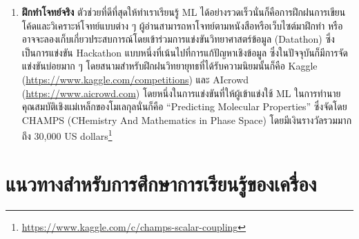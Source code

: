 \begin{enumerate}[topsep=0pt,noitemsep]
    \item \textbf{ฝึกทำโจทย์จริง} ตัวช่วยที่ดีที่สุดให้ทำเราเรียนรู้ ML ได้อย่างรวดเร็วนั่นก็คือการฝึกฝนการเขียนโค้ดและวิเคราะห์โจทย์แบบต่าง ๆ ผู้อ่านสามารถหาโจทย์ตามหนังสือหรือเว็บไซต์มาฝึกทำ หรืออาจจะลองเก็บเกี่ยวประสบการณ์โดยเข้าร่วมการแข่งขันวิทยาศาสตร์ข้อมูล (Datathon) ซึ่งเป็นการแข่งขัน Hackathon แบบหนึ่งที่เน้นไปที่การแก้ปัญหาเชิงข้อมูล ซึ่งในปัจจุบันก็มีการจัดแข่งขันบ่อยมาก ๆ โดยสนามสำหรับฝึกฝนวิทยายุทธที่ได้รับความนิยมนั้นก็คือ Kaggle (\url{https://www.kaggle.com/competitions}) และ AIcrowd (\url{https://www.aicrowd.com}) โดยหนึ่งในการแข่งขันที่ให้ผู้เข้าแข่งใช้ ML ในการทำนายคุณสมบัติเชิงแม่เหล็กของโมเลกุลนั่นก็คือ \enquote{Predicting Molecular Properties} ซึ่งจัดโดย CHAMPS (CHemistry And Mathematics in Phase Space) โดยมีเงินรางวัลรวมมากถึง 30,000 US dollars\footnote{\url{https://www.kaggle.com/c/champs-scalar-coupling}}
\end{enumerate}

\section{แนวทางสำหรับการศึกษาการเรียนรู้ของเครื่อง}
\label{sec:learn_ml}

